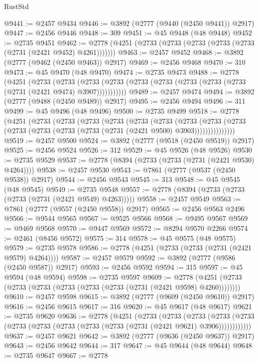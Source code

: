 \begin{lexlean}{RustStd}
\begin{coremodule}
@9441 := @2457 @9434
@9446 := @3892 (@2777 (@9440 (@2450 @9441)) @2917)
@9447 := @2456 @9446
@9448 := 309
@9451 := @45 @9448 (@48 @9448)
@9452 := @2735 @9451
@9462 := @2778 (@4251 (@2733 (@2733 (@2733 (@2733 (@2733 (@2731 (@2421 @9452) @4261)))))))
@9463 := @2457 @9452
@9468 := @3892 (@2777 (@9462 (@2450 @9463)) @2917)
@9469 := @2456 @9468
@9470 := 310
@9473 := @45 @9470 (@48 @9470)
@9474 := @2735 @9473
@9488 := @2778
    (@4251
      (@2733
        (@2733
          (@2733 (@2733 (@2733 (@2733 (@2733 (@2733 (@2733 (@2731 (@2421 @9474) @3907)))))))))))
@9489 := @2457 @9474
@9494 := @3892 (@2777 (@9488 (@2450 @9489)) @2917)
@9495 := @2456 @9494
@9496 := 311
@9499 := @45 @9496 (@48 @9496)
@9500 := @2735 @9499
@9518 := @2778
    (@4251
      (@2733
        (@2733
          (@2733
            (@2733
              (@2733
                (@2733
                  (@2733
                    (@2733
                      (@2733 (@2733 (@2733 (@2733 (@2733 (@2731 (@2421 @9500) @3903)))))))))))))))
@9519 := @2457 @9500
@9524 := @3892 (@2777 (@9518 (@2450 @9519)) @2917)
@9525 := @2456 @9524
@9526 := 312
@9529 := @45 @9526 (@48 @9526)
@9530 := @2735 @9529
@9537 := @2778 (@8394 (@2733 (@2733 (@2731 (@2421 @9530) @4264))))
@9538 := @2457 @9530
@9543 := @7861 (@2777 (@9537 (@2450 @9538)) @2917)
@9544 := @2456 @9543
@9545 := 313
@9548 := @45 @9545 (@48 @9545)
@9549 := @2735 @9548
@9557 := @2778 (@8394 (@2733 (@2733 (@2733 (@2731 (@2421 @9549) @4263)))))
@9558 := @2457 @9549
@9563 := @7861 (@2777 (@9557 (@2450 @9558)) @2917)
@9565 := @2456 @9563 @2496
@9566 := @9544 @9565
@9567 := @9525 @9566
@9568 := @9495 @9567
@9569 := @9469 @9568
@9570 := @9447 @9569
@9572 := @8294 @9570 @2266
@9574 := @2461 (@8456 @9572)
@9575 := 314
@9578 := @45 @9575 (@48 @9575)
@9579 := @2735 @9578
@9586 := @2778 (@4251 (@2733 (@2733 (@2731 (@2421 @9579) @4264))))
@9587 := @2457 @9579
@9592 := @3892 (@2777 (@9586 (@2450 @9587)) @2917)
@9593 := @2456 @9592
@9594 := 315
@9597 := @45 @9594 (@48 @9594)
@9598 := @2735 @9597
@9609 := @2778 (@4251 (@2733 (@2733 (@2733 (@2733 (@2733 (@2733 (@2731 (@2421 @9598) @4260))))))))
@9610 := @2457 @9598
@9615 := @3892 (@2777 (@9609 (@2450 @9610)) @2917)
@9616 := @2456 @9615
@9617 := 316
@9620 := @45 @9617 (@48 @9617)
@9621 := @2735 @9620
@9636 := @2778
    (@4251
      (@2733
        (@2733
          (@2733
            (@2733 (@2733 (@2733 (@2733 (@2733 (@2733 (@2733 (@2731 (@2421 @9621) @3906))))))))))))
@9637 := @2457 @9621
@9642 := @3892 (@2777 (@9636 (@2450 @9637)) @2917)
@9643 := @2456 @9642
@9644 := 317
@9647 := @45 @9644 (@48 @9644)
@9648 := @2735 @9647
@9667 := @2778

\end{coremodule}
\end{lexlean}
